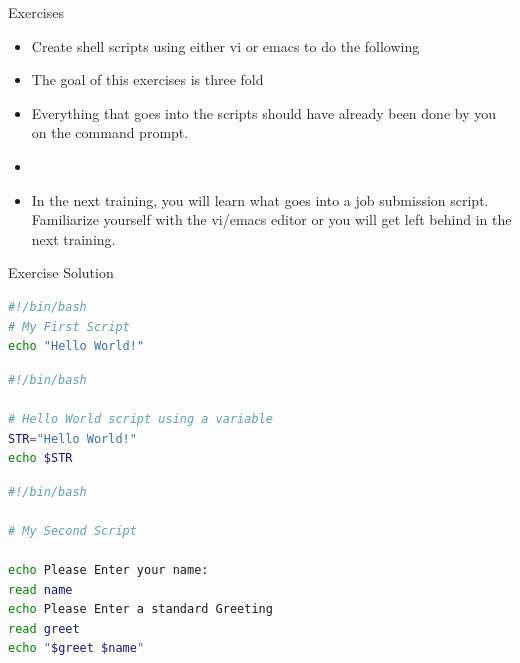 \documentclass[c,compress,xcolor=svgnames]{beamer}
\begin{document}
\begin{frame}{\small Exercises}
  \begin{itemize}
    \item Create shell scripts using either vi or emacs to do the following
    \item The goal of this exercises is three fold
    \item Everything that goes into the scripts should have already been done by you on the command prompt. 
    \item[]
    \item \alert{In the next training, you will learn what goes into a job submission script. Familiarize yourself with the vi/emacs editor or you will get left behind in the next training.}
  \end{itemize}
\end{frame}

\begin{frame}[fragile]{\small Exercise Solution}
  \begin{lstlisting}[language=bash,title={Exercise 1},captionpos=t,basicstyle=\fontsize{6}{7}\selectfont\ttfamily]
#!/bin/bash
# My First Script
echo "Hello World!"
  \end{lstlisting}
  \begin{lstlisting}[language=bash,title={Exercise 2},captionpos=t,basicstyle=\fontsize{6}{7}\selectfont\ttfamily]
#!/bin/bash

# Hello World script using a variable
STR="Hello World!"
echo $STR
  \end{lstlisting}
  \begin{lstlisting}[language=bash,title={Exercise 3},captionpos=t,basicstyle=\fontsize{6}{7}\selectfont\ttfamily]
#!/bin/bash

# My Second Script

echo Please Enter your name:
read name
echo Please Enter a standard Greeting
read greet
echo "$greet $name"
  \end{lstlisting}
\end{frame}
\end{document}
